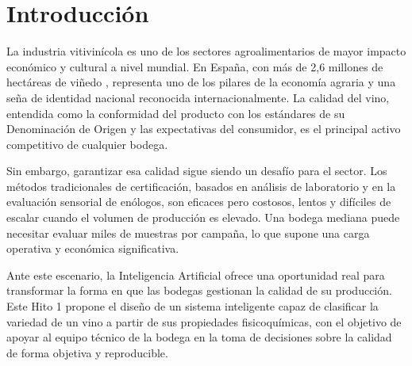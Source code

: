 \setcounter{secnumdepth}{-1} %

\chapter*{Introducción}

La industria vitivinícola es uno de los sectores agroalimentarios de mayor impacto 
económico y cultural a nivel mundial. En España, con más de 2,6 millones de hectáreas de viñedo
 \cite{MAPA2023}, representa uno de los pilares de la economía agraria y una seña de identidad 
nacional reconocida internacionalmente. La calidad del vino, entendida como la conformidad 
del producto con los estándares de su Denominación de Origen y las expectativas del 
consumidor, es el principal activo competitivo de cualquier bodega.

Sin embargo, garantizar esa calidad sigue siendo un desafío para el sector. Los métodos 
tradicionales de certificación, basados en análisis de laboratorio y en la evaluación 
sensorial de enólogos, son eficaces pero costosos, lentos y difíciles de escalar cuando 
el volumen de producción es elevado. Una bodega mediana puede necesitar evaluar miles de 
muestras por campaña, lo que supone una carga operativa y económica significativa.

Ante este escenario, la Inteligencia Artificial ofrece una oportunidad real para transformar 
la forma en que las bodegas gestionan la calidad de su producción. Este Hito 1 propone 
el diseño de un sistema inteligente capaz de clasificar la variedad de un vino a partir 
de sus propiedades fisicoquímicas, con el objetivo de apoyar al equipo técnico de la bodega 
en la toma de decisiones sobre la calidad de forma objetiva y reproducible.